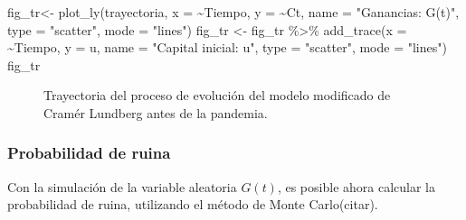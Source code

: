 \documentclass[
  us-letterpaper,
]{scrreprt}
\newenvironment{Shaded}{\begin{snugshade}}{\end{snugshade}}
\newcommand{\AttributeTok}[1]{\textcolor[rgb]{0.40,0.45,0.13}{#1}}
\newcommand{\FunctionTok}[1]{\textcolor[rgb]{0.28,0.35,0.67}{#1}}
\newcommand{\NormalTok}[1]{\textcolor[rgb]{0.00,0.23,0.31}{#1}}
\newcommand{\OtherTok}[1]{\textcolor[rgb]{0.00,0.23,0.31}{#1}}
\newcommand{\SpecialCharTok}[1]{\textcolor[rgb]{0.37,0.37,0.37}{#1}}
\newcommand{\StringTok}[1]{\textcolor[rgb]{0.13,0.47,0.30}{#1}}
\theoremstyle{definition}
\theoremstyle{plain}
\theoremstyle{plain}
\theoremstyle{remark}
\begin{document}
\begin{Shaded}
\begin{Highlighting}[]
\NormalTok{fig\_tr}\OtherTok{\textless{}{-}} \FunctionTok{plot\_ly}\NormalTok{(trayectoria, }\AttributeTok{x =} \SpecialCharTok{\textasciitilde{}}\NormalTok{Tiempo, }\AttributeTok{y =} \SpecialCharTok{\textasciitilde{}}\NormalTok{Ct, }
\AttributeTok{name =} \StringTok{"Ganancias: G(t)"}\NormalTok{, }\AttributeTok{type =} \StringTok{"scatter"}\NormalTok{, }\AttributeTok{mode =} \StringTok{"lines"}\NormalTok{)}
\NormalTok{fig\_tr }\OtherTok{\textless{}{-}}\NormalTok{ fig\_tr }\SpecialCharTok{\%\textgreater{}\%} \FunctionTok{add\_trace}\NormalTok{(}\AttributeTok{x =} \SpecialCharTok{\textasciitilde{}}\NormalTok{Tiempo, }\AttributeTok{y =}\NormalTok{ u,  }
\AttributeTok{name =} \StringTok{"Capital inicial: u"}\NormalTok{, }\AttributeTok{type =} \StringTok{"scatter"}\NormalTok{, }\AttributeTok{mode =} \StringTok{"lines"}\NormalTok{)}
\NormalTok{fig\_tr}
\end{Highlighting}
\end{Shaded}

\begin{figure}


\caption{\label{fig-fig-trayectoriapdf}Trayectoria del proceso de
evolución del modelo modificado de Cramér Lundberg antes de la
pandemia.}

\end{figure}%

\subsubsection{Probabilidad de ruina}\label{probabilidad-de-ruina}

Con la simulación de la variable aleatoria \(G(t)\), es posible ahora
calcular la probabilidad de ruina, utilizando el método de Monte
Carlo(citar).
\end{document}
